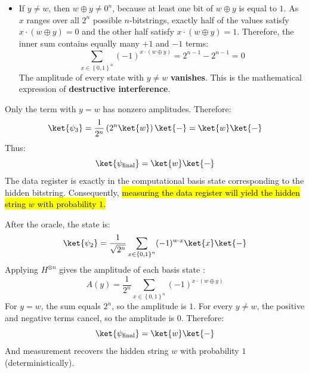 \begin{itemize}
    \item If $y \neq w$, then $w \oplus y \neq 0^n$, because at least one bit of $w \oplus y$ is equal to $1$. As $x$ ranges over all $2^n$ possible $n$-bitstrings, exactly half of the values satisfy $x \cdot (w \oplus y) = 0$ and the other half satisfy $x \cdot (w \oplus y) = 1$. Therefore, the inner sum contains equally many $+1$ and $-1$ terms:
    \begin{equation*}
        \sum_{x \in \left\{0,1\right\}^n} (-1)^{x \cdot (w \oplus y)} = 2^{n-1} - 2^{n-1} = 0
    \end{equation*}
    The amplitude of every state  with $y \neq w$ \textbf{vanishes}. This is the mathematical expression of \textbf{destructive interference}.
\end{itemize}
Only the term with $y = w$ has nonzero amplitudes. Therefore:
\begin{equation*}
    \ket{\psi_3} = \frac{1}{2^n} \left(2^n \ket{w}\right)\ket{-} = \ket{w} \ket{-}
\end{equation*}
Thus:
\begin{equation}
    \ket{\psi_{\text{final}}} = \ket{w} \ket{-}
\end{equation}
The data register is exactly in the computational basis state corresponding to the hidden bitstring. Consequently, \hl{measuring the data register will yield the hidden string $w$ with probability $1$.}

\highspace
\begin{takeawaysbox}
    After the oracle, the state is:
    \begin{equation*}
        \ket{\psi_2} = \frac{1}{\sqrt{2^n}} \sum_{x \in \left\{0,1\right\}^n} (-1)^{w \cdot x} \ket{x} \ket{-}
    \end{equation*}
    Applying $H^{\otimes n}$ gives the amplitude of each basis state :
    \begin{equation*}
        A(y) = \frac{1}{2^n} \sum_{x \in \left\{0,1\right\}^n} (-1)^{x \cdot (w \oplus y)}
    \end{equation*}
    For $y = w$, the sum equals $2^n$, so the amplitude is $1$. For every $y \neq w$, the positive and negative terms cancel, so the amplitude is $0$. Therefore:
    \begin{equation*}
        \ket{\psi_{\text{final}}} = \ket{w} \ket{-}
    \end{equation*}
    And measurement recovers the hidden string $w$ with probability $1$ (deterministically).
\end{takeawaysbox}